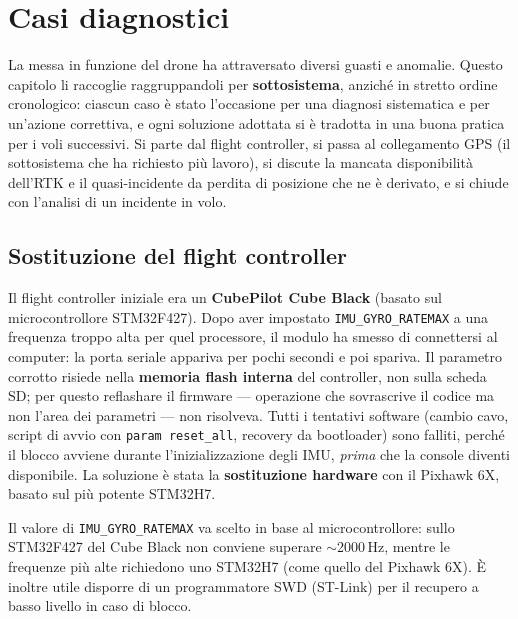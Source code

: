 \chapter{Casi diagnostici}
\label{cap:diagnostici}

La messa in funzione del drone ha attraversato diversi guasti e anomalie. Questo
capitolo li raccoglie raggruppandoli per \textbf{sottosistema}, anzich\'e in
stretto ordine cronologico: ciascun caso \`e stato l'occasione per una diagnosi
sistematica e per un'azione correttiva, e ogni soluzione adottata si \`e tradotta
in una buona pratica per i voli successivi. Si parte dal flight controller, si
passa al collegamento GPS (il sottosistema che ha richiesto pi\`u lavoro), si
discute la mancata disponibilit\`a dell'RTK e il quasi-incidente da perdita di
posizione che ne \`e derivato, e si chiude con l'analisi di un incidente in volo.

\section{Sostituzione del flight controller}

Il flight controller iniziale era un \textbf{CubePilot Cube Black} (basato sul
microcontrollore STM32F427). Dopo aver impostato \texttt{IMU\_GYRO\_RATEMAX} a una
frequenza troppo alta per quel processore, il modulo ha smesso di connettersi al
computer: la porta seriale appariva per pochi secondi e poi spariva. Il parametro
corrotto risiede nella \textbf{memoria flash interna} del controller, non sulla
scheda SD; per questo reflashare il firmware --- operazione che sovrascrive il
codice ma non l'area dei parametri --- non risolveva. Tutti i tentativi software
(cambio cavo, script di avvio con \texttt{param reset\_all}, recovery da
bootloader) sono falliti, perch\'e il blocco avviene durante l'inizializzazione
degli IMU, \emph{prima} che la console diventi disponibile. La soluzione \`e stata
la \textbf{sostituzione hardware} con il Pixhawk 6X, basato sul pi\`u potente
STM32H7.

\begin{notabox}
Il valore di \texttt{IMU\_GYRO\_RATEMAX} va scelto in base al microcontrollore:
sullo STM32F427 del Cube Black non conviene superare $\sim$2000\,Hz, mentre le
frequenze pi\`u alte richiedono uno STM32H7 (come quello del Pixhawk 6X). \`E
inoltre utile disporre di un programmatore SWD (ST-Link) per il recupero a basso
livello in caso di blocco.
\end{notabox}


